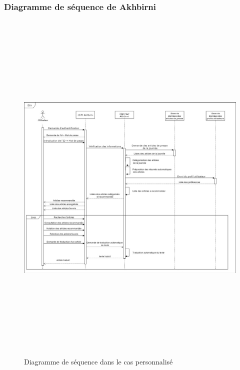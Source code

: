 \subsubsection{Diagramme de séquence de Akhbirni}
\begin{figure}[H]
    \centering
    \includegraphics[height=500pt,width=450pt]{img/chapter3/diag_seq_pers.jpg}
    \caption{Diagramme de séquence dans le cas personnalisé}
\end{figure}


